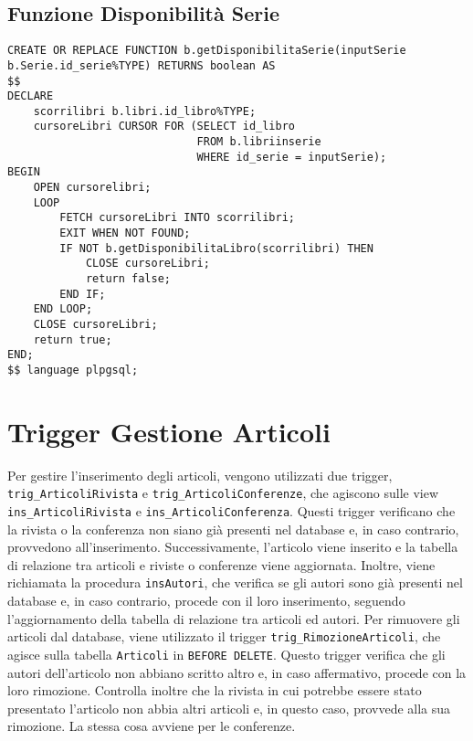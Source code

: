 \subsection{Funzione Disponibilità Serie}
\begin{lstlisting}
CREATE OR REPLACE FUNCTION b.getDisponibilitaSerie(inputSerie b.Serie.id_serie%TYPE) RETURNS boolean AS
$$
DECLARE
    scorrilibri b.libri.id_libro%TYPE;
    cursoreLibri CURSOR FOR (SELECT id_libro
                             FROM b.libriinserie
                             WHERE id_serie = inputSerie);
BEGIN
    OPEN cursorelibri;
    LOOP
        FETCH cursoreLibri INTO scorrilibri;
        EXIT WHEN NOT FOUND;
        IF NOT b.getDisponibilitaLibro(scorrilibri) THEN
            CLOSE cursoreLibri;
            return false;
        END IF;
    END LOOP;
    CLOSE cursoreLibri;
    return true;
END;
$$ language plpgsql;
\end{lstlisting}

\section{Trigger Gestione Articoli}
Per gestire l'inserimento degli articoli, vengono utilizzati due trigger,
\texttt{trig\_ArticoliRivista} e \texttt{trig\_ArticoliConferenze}, che agiscono sulle view
\texttt{ins\_ArticoliRivista} e \texttt{ins\_ArticoliConferenza}. Questi trigger verificano che la rivista 
o la conferenza non siano già presenti nel database e, in caso contrario, provvedono all'inserimento. Successivamente, 
l'articolo viene inserito e la tabella di relazione tra articoli e riviste o conferenze viene aggiornata. 
Inoltre, viene richiamata la procedura \texttt{insAutori}, che verifica se gli autori sono già presenti 
nel database e, in caso contrario, procede con il loro inserimento, seguendo l'aggiornamento della tabella 
di relazione tra articoli ed autori.
Per rimuovere gli articoli dal database, viene utilizzato il trigger \texttt{trig\_RimozioneArticoli}, che 
agisce sulla tabella \texttt{Articoli} in \texttt{BEFORE DELETE}. Questo trigger verifica che gli autori 
dell'articolo non abbiano scritto altro e, in caso affermativo, procede con la loro rimozione. Controlla 
inoltre che la rivista in cui potrebbe essere stato presentato l'articolo non abbia altri articoli e, in 
questo caso, provvede alla sua rimozione. La stessa cosa avviene per le conferenze.

